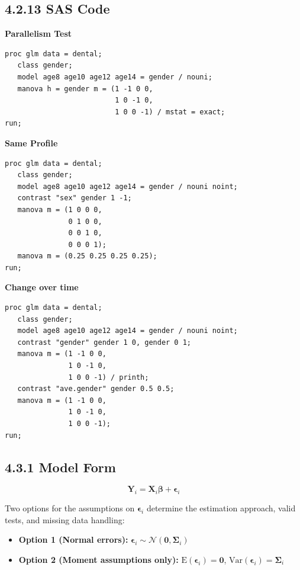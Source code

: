 \documentclass[11pt]{article}
\newcommand{\bY}{\mathbf{Y}}
\newcommand{\bX}{\mathbf{X}}
\newcommand{\bbeta}{\boldsymbol{\beta}}
\newcommand{\bepsilon}{\boldsymbol{\epsilon}}
\newcommand{\bSigma}{\boldsymbol{\Sigma}}
\newcommand{\E}{\mathrm{E}}
\newcommand{\Var}{\mathrm{Var}}
\newcommand{\Normal}{\mathcal{N}}
\begin{document}
\subsection*{4.2.13 SAS Code}

\textbf{Parallelism Test}
\begin{lstlisting}[style=SASstyle]
proc glm data = dental;
   class gender;
   model age8 age10 age12 age14 = gender / nouni;
   manova h = gender m = (1 -1 0 0,
                          1 0 -1 0,
                          1 0 0 -1) / mstat = exact;
run;
\end{lstlisting}

\textbf{Same Profile}
\begin{lstlisting}[style=SASstyle]
proc glm data = dental;
   class gender;
   model age8 age10 age12 age14 = gender / nouni noint;
   contrast "sex" gender 1 -1;
   manova m = (1 0 0 0,
               0 1 0 0,
               0 0 1 0,
               0 0 0 1);
   manova m = (0.25 0.25 0.25 0.25);
run;
\end{lstlisting}

\textbf{Change over time}
\begin{lstlisting}[style=SASstyle]
proc glm data = dental;
   class gender;
   model age8 age10 age12 age14 = gender / nouni noint;
   contrast "gender" gender 1 0, gender 0 1;
   manova m = (1 -1 0 0,
               1 0 -1 0,
               1 0 0 -1) / printh;
   contrast "ave.gender" gender 0.5 0.5;
   manova m = (1 -1 0 0,
               1 0 -1 0,
               1 0 0 -1);
run;
\end{lstlisting}

\newpage

\begin{tcolorbox}[modelbox, title={Model 3: General Linear Model (GLM)}]
\end{tcolorbox}

\subsection*{4.3.1 Model Form}

$$\bY_i = \bX_i \bbeta + \bepsilon_i$$

Two options for the assumptions on $\bepsilon_i$ determine the estimation approach, valid tests, and missing data handling:

\begin{itemize}[leftmargin=2em]
  \item \textbf{Option 1 (Normal errors):} $\bepsilon_i \sim \Normal(\mathbf{0}, \bSigma_i)$
  \item \textbf{Option 2 (Moment assumptions only):} $\E(\bepsilon_i) = \mathbf{0}$, $\Var(\bepsilon_i) = \bSigma_i$
\end{itemize}
\end{document}
